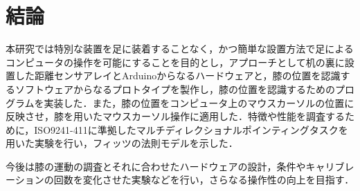 \chapter{結論}
本研究では特別な装置を足に装着することなく，かつ簡単な設置方法で足によるコンピュータの操作を可能にすることを目的とし，アプローチとして机の裏に設置した距離センサアレイとArduinoからなるハードウェアと，膝の位置を認識するソフトウェアからなるプロトタイプを製作し，膝の位置を認識するためのプログラムを実装した．また，膝の位置をコンピュータ上のマウスカーソルの位置に反映させ，膝を用いたマウスカーソル操作に適用した．特徴や性能を調査するために，ISO9241-411に準拠したマルチディレクショナルポインティングタスクを用いた実験を行い，フィッツの法則モデルを示した．

今後は膝の運動の調査とそれに合わせたハードウェアの設計，条件やキャリブレーションの回数を変化させた実験などを行い，さらなる操作性の向上を目指す．